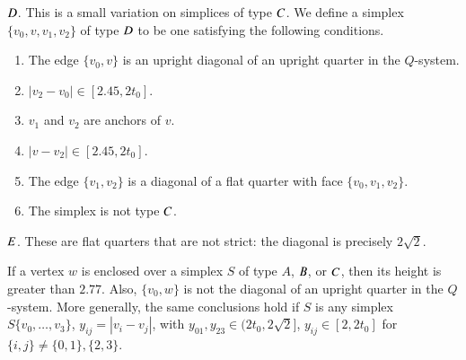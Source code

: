 $D$.  This is
a small variation on simplices of type $C$.  
We define a simplex $\{v_0,v,v_1,v_2\}$ of type $D$
to be one satisfying the following conditions.
    \begin{enumerate}
    \item The edge $\{v_0,v\}$ is an upright diagonal of an upright quarter
        in the $Q$-system.
    \item $|v_2-v_0|\in[2.45,2t_0]$.
    \item $v_1$ and $v_2$ are anchors of $v$.
    \item $|v-v_2|\in [2.45,2t_0]$.
    \item The edge $\{v_1,v_2\}$
    is a diagonal of a flat quarter with face $\{v_0,v_1,v_2\}$.
    \item The simplex is not type $C$.
    \end{enumerate}



$E$.  These are flat quarters that are not strict: the diagonal is precisely
$2\sqrt2$.

\begin{lemma}
If a vertex $w$ is enclosed over a simplex $S$ of type $A$, $B$,
or $C$, then its height is greater than $2.77$.  Also, $\{v_0,w\}$
is not the diagonal of an upright quarter in the $Q$-system.
More generally, the same conclusions hold if $S$ is any simplex
$S\{v_0,\ldots,v_3\}$, $y_{ij}=|v_i-v_j|$, with $y_{01},y_{23}\in(2t_0,2\sqrt{2}]$,
$y_{ij}\in[2,2t_0]$ for $\{i,j\}\ne\{0,1\},\{2,3\}$.
\end{lemma}


